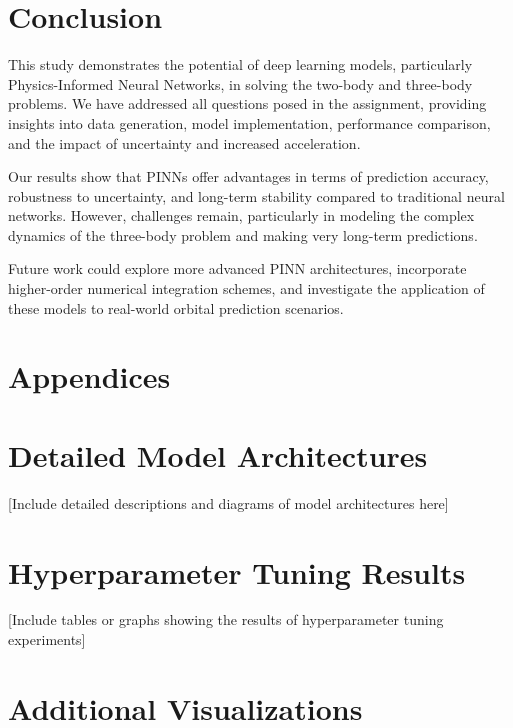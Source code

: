 \documentclass[12pt,a4paper]{article}
\begin{document}
\section{Conclusion}
\label{sec:conclusion}
This study demonstrates the potential of deep learning models, particularly Physics-Informed Neural Networks, in solving the two-body and three-body problems. We have addressed all questions posed in the assignment, providing insights into data generation, model implementation, performance comparison, and the impact of uncertainty and increased acceleration.

Our results show that PINNs offer advantages in terms of prediction accuracy, robustness to uncertainty, and long-term stability compared to traditional neural networks. However, challenges remain, particularly in modeling the complex dynamics of the three-body problem and making very long-term predictions.

Future work could explore more advanced PINN architectures, incorporate higher-order numerical integration schemes, and investigate the application of these models to real-world orbital prediction scenarios.




\section{Appendices}

\appendix

\section{Detailed Model Architectures}
\label{appendix:model_architectures}

[Include detailed descriptions and diagrams of model architectures here]

\section{Hyperparameter Tuning Results}
\label{appendix:hyperparameter_tuning}

[Include tables or graphs showing the results of hyperparameter tuning experiments]

\section{Additional Visualizations}
\label{appendix:additional_visualizations}
\end{document}
